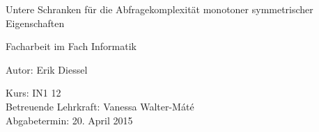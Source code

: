\begin{titlepage}

\begin{center}

\vspace*{3cm}

\sffamily
\bfseries

\Huge
Untere Schranken für die Abfragekomplexität monotoner
symmetrischer Eigenschaften


\vspace*{1cm}

\Large
Facharbeit im Fach Informatik

\vspace*{3cm}

\textmd{Autor:} \LARGE{Erik Diessel}

\Large
\vspace*{3cm}
\textmd{Kurs:} IN1 12 \\
\vspace*{1cm}
\textmd{Betreuende Lehrkraft:} Vanessa Walter-Máté \\
\vspace*{1cm}
\textmd{Abgabetermin:} 20. April 2015


\end{center}

\end{titlepage}
